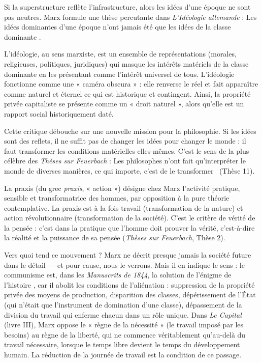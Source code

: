 \documentclass[11pt]{article}
\newcommand{\cle}[1]{{\popxbold\color{popdark}#1}}
\newcounter{popsec}
\newcounter{popsub}
\newcommand{\courssub}[1]{%
  \stepcounter{popsub}%
  \par\vspace{9pt}\noindent{\popxbold\fontsize{11.5}{13}\selectfont\color{popink}{\color{poporange}\thepopsec.\thepopsub}\hspace{6pt}#1}\par\nopagebreak\vspace{4pt}
}
\begin{document}
Si la superstructure reflète l'infrastructure, alors les idées d'une époque ne sont pas neutres. Marx formule une thèse percutante dans \emph{L'Idéologie allemande} : \guillemotleft Les idées dominantes d'une époque n'ont jamais été que les idées de la classe dominante \guillemotright.

\begin{definition}[Idéologie]
L'\cle{idéologie}, au sens marxiste, est un ensemble de représentations (morales, religieuses, politiques, juridiques) qui masque les intérêts matériels de la classe dominante en les présentant comme l'intérêt universel de tous. L'idéologie fonctionne comme une « caméra obscura » : elle renverse le réel et fait apparaître comme naturel et éternel ce qui est historique et contingent. Ainsi, la propriété privée capitaliste se présente comme un « droit naturel », alors qu'elle est un rapport social historiquement daté.
\end{definition}

Cette critique débouche sur une nouvelle mission pour la philosophie. Si les idées sont des reflets, il ne suffit pas de changer les idées pour changer le monde : il faut transformer les conditions matérielles elles-mêmes. C'est le sens de la plus célèbre des \emph{Thèses sur Feuerbach} : \guillemotleft Les philosophes n'ont fait qu'interpréter le monde de diverses manières, ce qui importe, c'est de le transformer \guillemotright\ (Thèse 11).

\begin{definition}[Praxis]
La \cle{praxis} (du grec \emph{praxis}, « action ») désigne chez Marx l'activité pratique, sensible et transformatrice des hommes, par opposition à la pure théorie contemplative. La praxis est à la fois travail (transformation de la nature) et action révolutionnaire (transformation de la société). C'est le critère de vérité de la pensée : c'est dans la pratique que l'homme doit prouver la vérité, c'est-à-dire la réalité et la puissance de sa pensée (\emph{Thèses sur Feuerbach}, Thèse 2).
\end{definition}

\courssub{Le communisme : la solution de l'énigme de l'histoire}

Vers quoi tend ce mouvement ? Marx ne décrit presque jamais la société future dans le détail — et pour cause, nous le verrons. Mais il en indique le sens : le \cle{communisme} est, dans les \emph{Manuscrits de 1844}, la \guillemotleft solution de l'énigme de l'histoire \guillemotright, car il abolit les conditions de l'aliénation : suppression de la propriété privée des moyens de production, disparition des classes, dépérissement de l'État (qui n'était que l'instrument de domination d'une classe), dépassement de la division du travail qui enferme chacun dans un rôle unique. Dans \emph{Le Capital} (livre III), Marx oppose le « règne de la nécessité » (le travail imposé par les besoins) au \cle{règne de la liberté}, qui ne commence véritablement qu'au-delà du travail nécessaire, lorsque le temps libre devient le temps du développement humain. La réduction de la journée de travail est la condition de ce passage.
\end{document}
